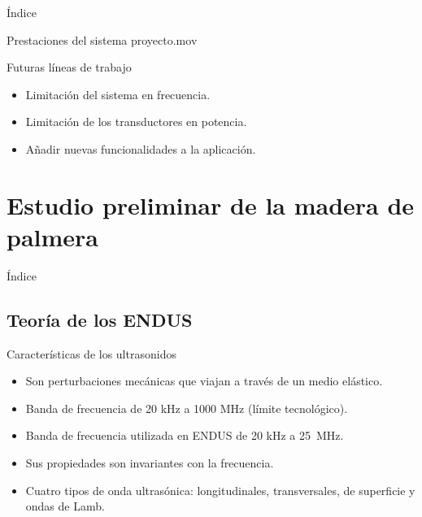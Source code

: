 \documentclass[utf8, compress]			{beamer}
\begin{document}
\begin{frame}{Índice}
    \tableofcontents[currentsubsection]
\end{frame}

\begin{frame}{Prestaciones del sistema}
    \centering{}
    {proyecto.mov}
\end{frame}

\begin{frame}{Futuras líneas de trabajo}
    \begin{itemize}
	\item Limitación del sistema en frecuencia.
	\item Limitación de los transductores en potencia.
	\item Añadir nuevas funcionalidades a la aplicación.
    \end{itemize}
\end{frame}


\section{Estudio preliminar de la madera de palmera}

\begin{frame}{Índice}
    \tableofcontents[currentsection]
\end{frame}


\subsection{Teoría de los ENDUS}

\begin{frame}{Características de los ultrasonidos}
    \begin{itemize}
	\item Son perturbaciones mecánicas que viajan a través de un medio
	    elástico.
	\item Banda de frecuencia de 20 kHz a 1000 MHz (límite
	    tecnológico).
	\item Banda de frecuencia utilizada en ENDUS de 20 kHz a 25~MHz.
	\item Sus propiedades son invariantes con la frecuencia.
	\item Cuatro tipos de onda ultrasónica: longitudinales,
	    transversales, de superficie y ondas de Lamb.
    \end{itemize}
\end{frame}
\end{document}
